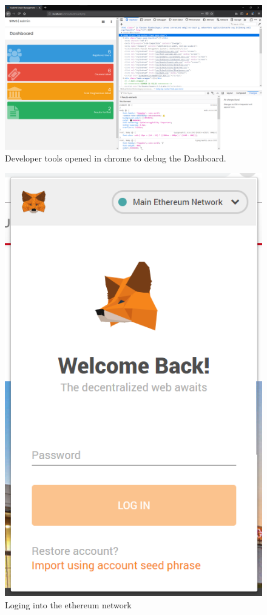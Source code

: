 \begin{figure}[H]
\includegraphics[scale=0.3]{images/dev_tools.png}
\caption{Developer tools opened in chrome to debug the Dashboard.}
\end{figure}

\begin{figure}[H]
\center
\includegraphics[scale=0.6]{images/metamasklogin.png}
\caption{Loging into the ethereum network}
\end{figure}